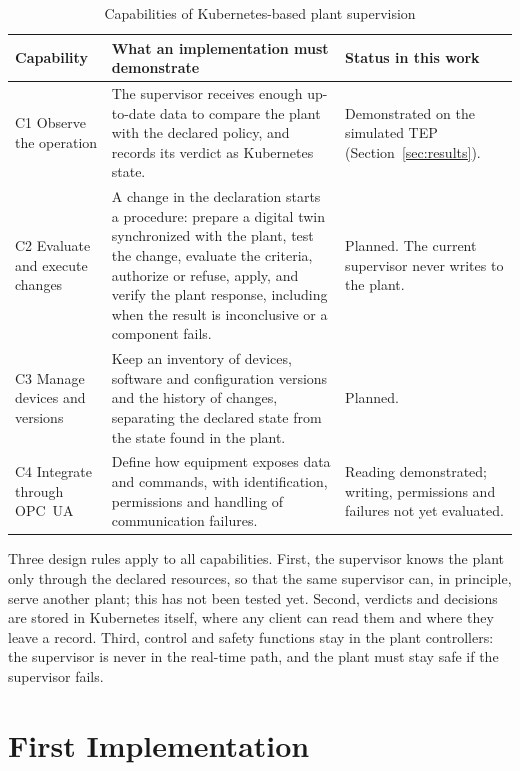 \documentclass[conference]{IEEEtran}
\begin{document}
\begin{table}[t]
\caption{Capabilities of Kubernetes-based plant supervision}
\label{tab:caps}
\centering
\footnotesize
\begin{tabular}{@{}>{\raggedright\arraybackslash}p{}>{\raggedright\arraybackslash}p{}>{\raggedright\arraybackslash}p{}@{}}
\toprule
Capability & What an implementation must demonstrate & Status in this work \\
\midrule
C1 Observe the operation & The supervisor receives enough up-to-date data to compare the plant with the declared policy, and records its verdict as Kubernetes state. & Demonstrated on the simulated TEP (Section~\ref{sec:results}). \\
C2 Evaluate and execute changes & A change in the declaration starts a procedure: prepare a digital twin synchronized with the plant, test the change, evaluate the criteria, authorize or refuse, apply, and verify the plant response, including when the result is inconclusive or a component fails. & Planned. The current supervisor never writes to the plant. \\
C3 Manage devices and versions & Keep an inventory of devices, software and configuration versions and the history of changes, separating the declared state from the state found in the plant. & Planned. \\
C4 Integrate through OPC~UA & Define how equipment exposes data and commands, with identification, permissions and handling of communication failures. & Reading demonstrated; writing, permissions and failures not yet evaluated. \\
\bottomrule
\end{tabular}
\end{table}

Three design rules apply to all capabilities. First, the supervisor knows the plant only through the declared resources, so that the same supervisor can, in principle, serve another plant; this has not been tested yet. Second, verdicts and decisions are stored in Kubernetes itself, where any client can read them and where they leave a record. Third, control and safety functions stay in the plant controllers: the supervisor is never in the real-time path, and the plant must stay safe if the supervisor fails.

\section{First Implementation}
\label{sec:impl}
\end{document}
